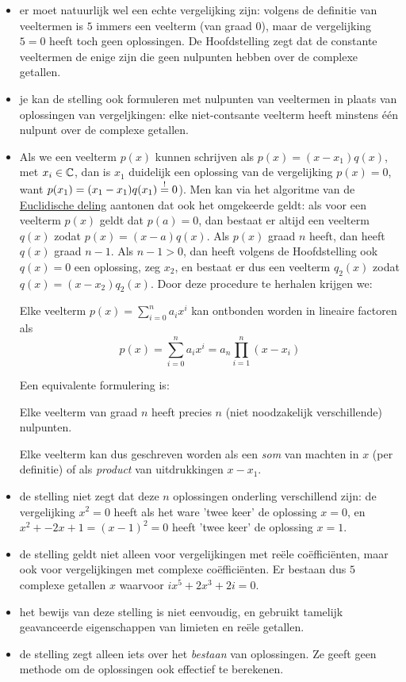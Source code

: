 \documentclass{ximera}
\begin{document}
\begin{remark}\nl
\begin{itemize}
\item er moet natuurlijk wel een echte vergelijking zijn: volgens de definitie van veeltermen is $5$ immers een veelterm (van graad 0), maar de vergelijking $5=0$ heeft toch geen oplossingen. De Hoofdstelling zegt dat de constante veeltermen de enige zijn die geen nulpunten hebben over de complexe getallen.
\item je kan de stelling ook formuleren met nulpunten van veeltermen in plaats van oplossingen van vergeljkingen: elke niet-contsante veelterm heeft minstens één nulpunt over de complexe getallen.
\item Als we een veelterm $p(x)$ kunnen schrijven als $p(x) = (x-x_1)q(x)$, met $x_i\in\mathbb{C}$, dan is $x_1$ duidelijk een oplossing van de vergelijking $p(x)=0$, want  $p(x_1) = (x_1-x_1)q(x_1)\overset{!}{=} 0$). Men kan via het algoritme van de \hyperref[xim:euclidische_deling]{Euclidische deling} aantonen dat ook het omgekeerde geldt: als voor een veelterm $p(x)$ geldt dat $p(a)=0$, dan bestaat er altijd een veelterm $q(x)$ zodat $p(x)=(x-a)q(x)$. Als $p(x)$ graad $n$ heeft, dan heeft  $q(x)$ graad $n-1$. Als $n-1>0$, dan heeft volgens de Hoofdstelling ook $q(x)=0$ een oplossing, zeg $x_2$, en bestaat er dus een veelterm $q_2(x)$ zodat $q(x) = (x-x_2)q_2(x)$. Door deze procedure te herhalen krijgen we:
\begin{proposition}
Elke veelterm  $p(x)=\sum_{i=0}^n a_ix^i$ kan ontbonden worden in lineaire factoren als
$$
p(x)=\sum_{i=0}^n a_ix^i = a_n\prod_{i=1}^n (x-x_i)
$$

Een equivalente formulering is:

Elke veelterm van graad $n$ heeft precies $n$ (niet noodzakelijk verschillende) nulpunten.
\end{proposition}
Elke veelterm kan dus geschreven worden als een \textit{som} van machten in $x$ (per definitie) of als \textit{product} van uitdrukkingen $x-x_1$.
\item de stelling niet zegt dat deze $n$ oplossingen onderling verschillend zijn: de vergelijking $x^2 = 0$ heeft als het ware 'twee keer' de oplossing $x=0$, en $x^2+-2x+1 = (x-1)^2 = 0$ heeft 'twee keer' de oplossing $x=1$. 
\item de stelling geldt niet alleen voor vergelijkingen met reële coëfficiënten, maar ook voor vergelijkingen met complexe coëfficiënten. Er bestaan dus $5$ complexe getallen $x$ waarvoor $ix^5 +2x^3 +2i = 0$. 
\item het bewijs van deze stelling is niet eenvoudig, en gebruikt tamelijk geavanceerde eigenschappen van limieten en  reële getallen.
\item de stelling zegt alleen iets over het \textit{bestaan} van oplossingen. Ze geeft geen methode om de oplossingen ook effectief te berekenen.
\end{itemize}
\end{remark}
\end{document}
